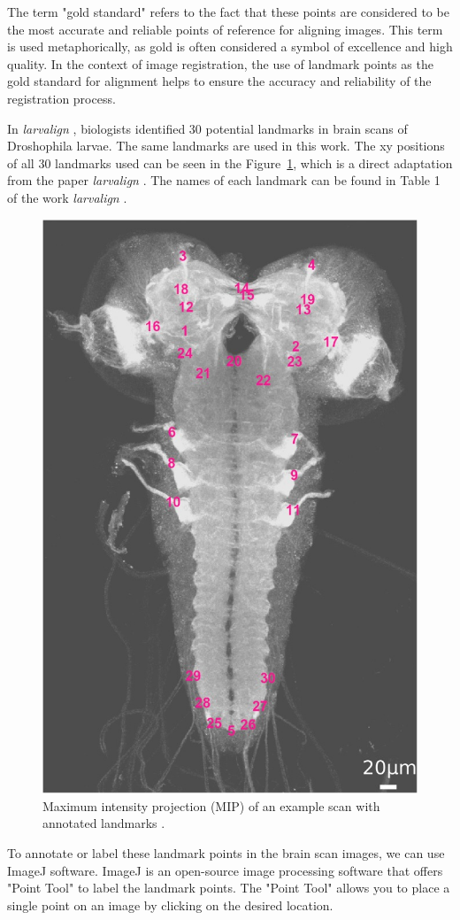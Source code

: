 \documentclass{book}
\begin{document}
	The term "gold standard" refers to the fact that these points are considered to be the most accurate and reliable points of reference for aligning images. This term is used metaphorically, as gold is often considered a symbol of excellence and high quality. In the context of image registration, the use of landmark points as the gold standard for alignment helps to ensure the accuracy and reliability of the registration process.
	
	In \textit{larvalign} \cite{larvalign}, biologists identified 30 potential landmarks in brain scans of Droshophila larvae. The same landmarks are used in this work. The xy positions of all 30 landmarks used can be seen in the Figure~\ref{fig:landmark_annotations}, which is a direct adaptation from the paper \emph{larvalign} \cite{larvalign}. The names of each landmark can be found in Table 1 of the work \emph{larvalign} \cite{larvalign}.
	
	\begin{figure}[h!]
		\centering
		\includegraphics[width=0.5\columnwidth]{resources/chapter3/landmarks.jpg}
		\caption{Maximum intensity projection (MIP) of an example scan with annotated landmarks \cite{larvalign}.}
		\label{fig:landmark_annotations}
	\end{figure}
	
	To annotate or label these landmark points in the brain scan images, we can use ImageJ software. ImageJ is an open-source image processing software that offers "Point Tool" to label the landmark points. The "Point Tool" allows you to place a single point on an image by clicking on the desired location.
	
\end{document}
